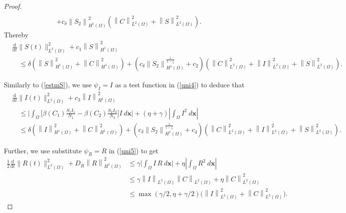 \documentclass[10pt,a4paper]{amsart}
\begin{document}
\begin{proof}
\begin{equation*}
\begin{split}
				\\&+c_{\delta}\left\|S_2\right\|_{H^{1}(\Omega)}^{2}\left( \left\|C\right\|_{L^{2}(\Omega)}^2+\left\|S\right\|_{L^{2}(\Omega)}^2\right). 
			\end{split}
		\end{equation*}
		Thereby
		\begin{equation}\label{estmS}
			\begin{split}
				&\frac{\mathrm{d}}{\mathrm{d} t}\|S(t)\|_{L^2(\Omega)}^{2}+c_1\left\|S\right\|_{H^{1}(\Omega)}^{2}\\
				&\quad\leq \delta \left(\left\|S\right\|_{H^{1}(\Omega)}^2+\left\|C\right\|_{H^{1}(\Omega)}^2\right)+\left(c_{\delta}\left\|S_2\right\|_{H^{1}(\Omega)}^{\frac{1}{1-\zeta}}+c_2\right)\left( \left\|C\right\|_{L^{2}(\Omega)}^2+\left\|I\right\|_{L^{2}(\Omega)}^2+\left\|S\right\|_{L^{2}(\Omega)}^2\right). 
			\end{split}
		\end{equation}
		
		
		\noindent Similarly to (\ref{estmS}),  we use $\psi_I=I$ as a test function in (\ref{uni4}) to deduce that   
		\begin{equation}\label{estmI}
			\begin{split}
				&\displaystyle \frac{\mathrm{d}}{\mathrm{d} t}\|I(t)\|_{L^2(\Omega)}^{2}+c_3\left\|I\right\|_{H^{1}(\Omega)}^{2}
				\\
				&\quad\leq  \Big|\int_{\Omega}\Big[\beta(C_1)\frac{S_1 I_1}{N_1}-\beta(C_2)\frac{S_2 I_2}{N_2}\Big] I~d{\mathbf{x}}\Big| +(\eta+\gamma)\left|\int_{\Omega} I^2~d{\mathbf{x}} \right|
				\\
				&\quad\leq \delta \left(\left\|I\right\|_{H^{1}(\Omega)}^2+\left\|C\right\|_{H^{1}(\Omega)}^2\right)+\left(c_{\delta}\left\|S_2\right\|_{H^{1}(\Omega)}^{\frac{1}{1-\zeta}}+c_4\right)
				\left( \left\|C\right\|_{L^{2}(\Omega)}^2+\left\|I\right\|_{L^{2}(\Omega)}^2+\left\|S\right\|_{L^{2}(\Omega)}^2\right) 
				.
			\end{split}
		\end{equation}
		
		
		\noindent Further, we use substitute $\psi_R=R$ in (\ref{uni5}) to get   
		\begin{equation}\label{estmR}
			\begin{split}
				\displaystyle \frac{1}{2}\frac{\mathrm{d}}{\mathrm{d} t}\|R(t)\|_{L^2(\Omega)}^{2}+D_R\left\|R\right\|_{H^{1}(\Omega)}^{2}&\leq  \gamma \Big|\int_{\Omega}I\, R~d{\mathbf{x}}\Big| +\eta\left|\int_{\Omega} R^2~d{\mathbf{x}} \right|
				\\&\leq\gamma\left\|I\right\|_{L^{2}(\Omega)}\left\|C\right\|_{L^{2}(\Omega)}+\eta \left\|C\right\|_{L^{2}(\Omega)}^{2}
				\\&\leq\max(\gamma/2,\eta+\gamma/2)\Big(\left\|I\right\|_{L^{2}(\Omega)}^2+ \left\|C\right\|_{L^{2}(\Omega)}^{2}\Big)
				.
			\end{split}
		\end{equation}
		

\end{proof}
\end{document}
